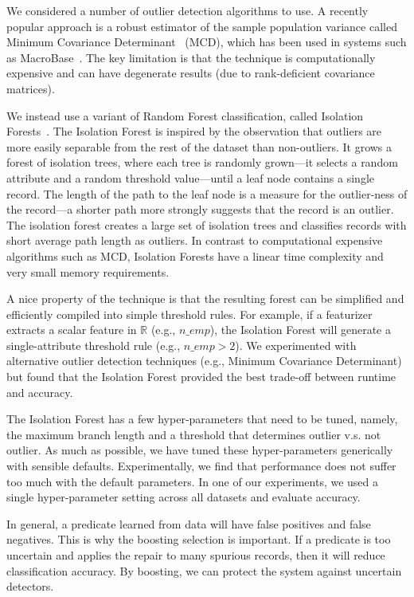 We considered a number of outlier detection algorithms to use.  A recently popular approach is a robust estimator of the sample population variance called Minimum Covariance Determinant~\cite{rousseeuw2011robust} (MCD), which has been used in systems such as MacroBase~\cite{bailis2016macrobase}.  The key limitation is that the technique is computationally expensive and can have degenerate results (due to rank-deficient covariance matrices).

We instead use a variant of Random Forest classification, called Isolation Forests~\cite{liu2008isolation}.  The Isolation Forest is inspired by the observation that outliers are more easily separable from the rest of the dataset than non-outliers.  It grows a forest of isolation trees, where each tree is randomly grown---it selects a random attribute and a random threshold value---until a leaf node contains a single record.  The length of the path to the leaf node is a measure for the outlier-ness of the record---a shorter path more strongly suggests that the record is an outlier.  The isolation forest creates a large set of isolation trees and classifies records with short average path length as outliers.  In contrast to computational expensive algorithms such as MCD, Isolation Forests have a linear time complexity and very small memory requirements.  

A nice property of the technique is that the resulting forest can be simplified and efficiently compiled into simple threshold rules. 
For example, if a featurizer extracts a scalar feature in $\mathbb{R}$ (e.g., $n\_emp$), the Isolation Forest will generate a single-attribute threshold rule (e.g., $n\_emp > 2$).  
 We experimented with alternative outlier detection techniques (e.g., Minimum Covariance Determinant) but found that the Isolation Forest provided the best trade-off between runtime and accuracy.
 
 The Isolation Forest has a few hyper-parameters that need to be tuned, namely, the maximum branch length and a threshold that determines outlier v.s. not outlier. As much as possible, we have tuned these hyper-parameters generically with sensible defaults. Experimentally, we find that performance does not suffer too much with the default parameters.
In one of our experiments, we used a single hyper-parameter setting across all datasets and evaluate accuracy. 
 
 In general, a predicate learned from data will have false positives and false negatives.
This is why the boosting selection is important.
If a predicate is too uncertain and applies the repair to many spurious records, then it will reduce classification accuracy.
By boosting, we can protect the system against uncertain detectors.

